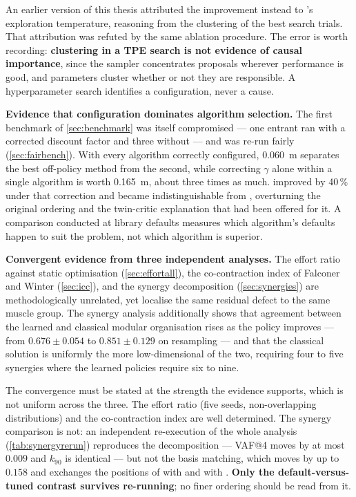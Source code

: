 An earlier version of this thesis attributed the improvement instead to \SAC's
exploration temperature, reasoning from the clustering of the best search trials.
That attribution was refuted by the same ablation procedure. The error is worth
recording: \textbf{clustering in a TPE search is not evidence of causal
importance}, since the sampler concentrates proposals wherever performance is
good, and parameters cluster whether or not they are responsible. A
hyperparameter search identifies a configuration, never a cause.

\textbf{Evidence that configuration dominates algorithm selection.} The first
benchmark of \cref{sec:benchmark} was itself compromised --- one entrant ran with
a corrected discount factor and three without --- and was re-run fairly
(\cref{sec:fairbench}). With every algorithm correctly configured,
\SI{0.060}{\meter} separates the best off-policy method from the second, while
correcting $\gamma$ alone within a single algorithm is worth \SI{0.165}{\meter},
about three times as much. \DDPG{} improved by 40\,\% under that correction and
became indistinguishable from \TDIII, overturning the original ordering and the
twin-critic explanation that had been offered for it. A comparison conducted at
library defaults measures which algorithm's defaults happen to suit the problem,
not which algorithm is superior.

\textbf{Convergent evidence from three independent analyses.} The effort ratio
against static optimisation (\cref{sec:effortall}), the co-contraction index of
Falconer and Winter (\cref{sec:icc}), and the synergy decomposition
(\cref{sec:synergies}) are methodologically unrelated, yet localise the same
residual defect to the same muscle group. The synergy analysis additionally shows
that agreement between the learned and classical modular organisation rises as
the policy improves --- from $0.676 \pm 0.054$ to $0.851 \pm 0.129$ on resampling
--- and that the classical solution is uniformly the more low-dimensional of the
two, requiring four to five synergies where the learned policies require six to
nine.

The convergence must be stated at the strength the evidence supports, which is
not uniform across the three. The effort ratio (five seeds, non-overlapping
distributions) and the co-contraction index are well determined. The synergy
comparison is not: an independent re-execution of the whole analysis
(\cref{tab:synergyrerun}) reproduces the decomposition --- VAF@4 moves by at most
$0.009$ and $k_{90}$ is identical --- but not the basis matching, which moves by
up to $0.158$ and exchanges the positions of \TDIII{} with \DDPG{} and \PPO{}
with \SAC. \textbf{Only the default-versus-tuned contrast survives re-running};
no finer ordering should be read from it.

